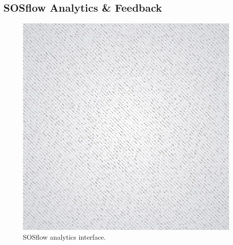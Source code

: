 \subsection{SOSflow Analytics \& Feedback}
%
%
\par
%
%
\begin{figure}[h]
\centering
\includegraphics[width=\columnwidth]{images/placeholder.jpg}
\caption{SOSflow analytics interface.}
\label{fig_analytics_interface}
\end{figure}
%
%
%
